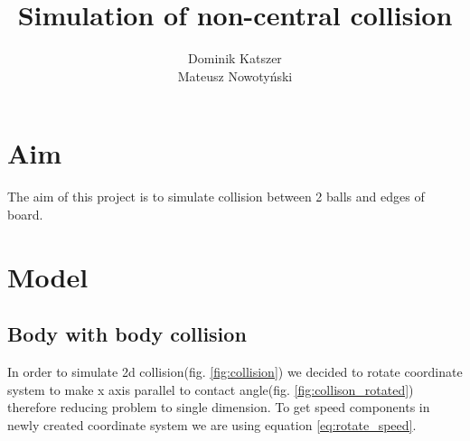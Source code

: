 \documentclass[]{report}
\title{Simulation of non-central collision}
\author{Dominik Katszer \\Mateusz Nowotyński}
\begin{document}
\maketitle

\section{Aim}
The aim of this project is to simulate collision between 2 balls and edges of board.

\section{Model}
\subsection{Body with body collision}
In order to simulate 2d collision(fig. \ref{fig:collision}) we decided to rotate coordinate system to make x axis parallel to contact angle(fig. \ref{fig:collison_rotated}) therefore reducing problem to single dimension. To get speed components in newly created coordinate system we are using equation \ref{eq:rotate_speed}.
\end{document}
